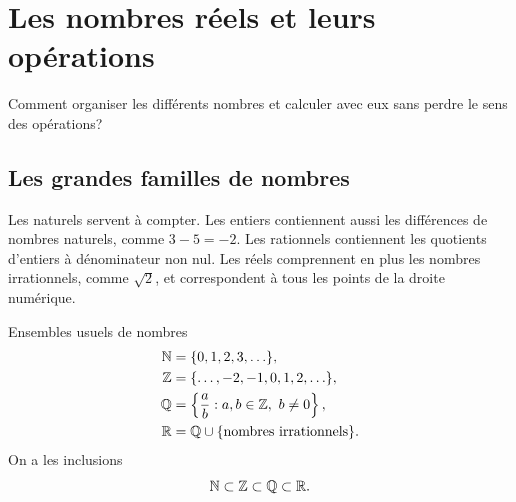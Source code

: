 \chapter{Les nombres réels et leurs opérations}
\label{manual:chapter:01}

\begin{questionbox}
Comment organiser les différents nombres et calculer avec eux sans perdre le sens des opérations?
\end{questionbox}

\section{Les grandes familles de nombres}
\label{manual:section:01.01}

\begin{intuitionbox}
Les naturels servent à compter. Les entiers contiennent aussi les différences de nombres naturels, comme $3-5=-2$. Les rationnels contiennent les quotients d'entiers à dénominateur non nul. Les réels comprennent en plus les nombres irrationnels, comme $\sqrt2$, et correspondent à tous les points de la droite numérique.
\end{intuitionbox}

\begin{definition}{Ensembles usuels de nombres}{}
\begin{align*}
\mathbb{N}&=\{0,1,2,3,\ldots\},\\
\mathbb{Z}&=\{\ldots,-2,-1,0,1,2,\ldots\},\\
\mathbb{Q}&=\left\{\frac ab:a,b\in\mathbb{Z},\ b\neq0\right\},\\
\mathbb{R}&=\mathbb{Q}\cup\{\text{nombres irrationnels}\}.
\end{align*}
On a les inclusions
\[
\mathbb{N}\subset\mathbb{Z}\subset\mathbb{Q}\subset\mathbb{R}.
\]
\end{definition}

\begin{center}
\end{center}

